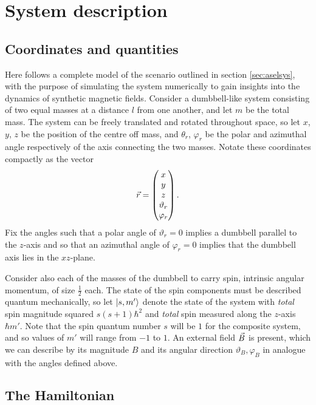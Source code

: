 \documentclass[a4paper]{article}
\begin{document}
\section{System description}
\subsection{Coordinates and quantities}
Here follows a complete model of the scenario outlined in section \ref{sec:aselsys}, with
the purpose of simulating the system numerically to gain insights into the dynamics of
synthetic magnetic fields. Consider a dumbbell-like system consisting of two equal masses at a distance \(l\) from one
another, and let \(m\) be the total mass. The system can be freely translated and rotated
throughout space, so let \(x\), \(y\), \(z\)  be the position
of the centre off mass, and \(\theta_r\), \(\varphi_r\) be the polar and azimuthal angle
respectively of the axis connecting the two masses. Notate these coordinates compactly as the
vector \[
\vec{r}
= \begin{pmatrix} x\\ y \\ z\\ \vartheta_r \\\varphi_r\end{pmatrix}
.\] 
Fix the angles such that a polar angle of \(\vartheta_r = 0\) implies a dumbbell parallel
to the \(z\)-axis and so that an azimuthal angle of \(\varphi_r = 0\) implies that the dumbbell
axis lies in the \(xz\)-plane. 

Consider also each of the masses of the dumbbell to carry spin, intrinsic angular
momentum, of size \(\frac{1}{2}\) each. %
 The state of the spin components must be
described quantum mechanically, so let \(\ket{s, m'}\) denote the state of the system with
\textit{total} spin magnitude squared \(s(s+1)\hbar^2\) and \textit{total} spin measured
along the \(z\)-axis \(\hbar m'\). Note that the spin quantum number \(s\) will be \(1\) for
the composite system, and so values of \(m'\) will range from \(-1\) to \(1\). An external field \(\vec{B}\) is present, which
we can describe by its magnitude \(B\) and its angular direction \(\vartheta_B, \varphi_B\)
in analogue with the angles defined above.

\subsection{The Hamiltonian}\label{sec:sysham}
\end{document}
